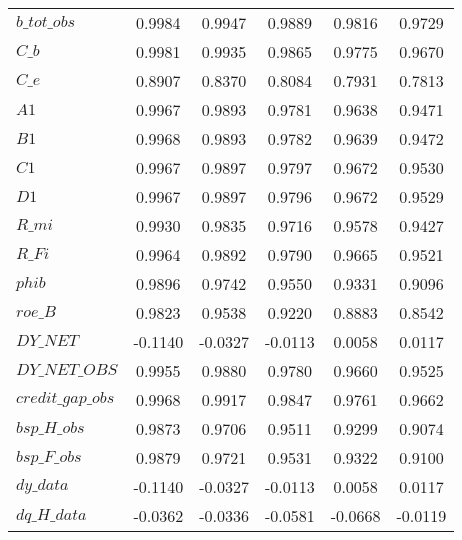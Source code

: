 \begin{center}
\begin{longtable}{lccccc}
$b\_tot\_obs                $	 & 	    0.9984	 & 	    0.9947	 & 	    0.9889	 & 	    0.9816	 & 	    0.9729 \\ 
$C\_b                       $	 & 	    0.9981	 & 	    0.9935	 & 	    0.9865	 & 	    0.9775	 & 	    0.9670 \\ 
$C\_e                       $	 & 	    0.8907	 & 	    0.8370	 & 	    0.8084	 & 	    0.7931	 & 	    0.7813 \\ 
$A1                         $	 & 	    0.9967	 & 	    0.9893	 & 	    0.9781	 & 	    0.9638	 & 	    0.9471 \\ 
$B1                         $	 & 	    0.9968	 & 	    0.9893	 & 	    0.9782	 & 	    0.9639	 & 	    0.9472 \\ 
$C1                         $	 & 	    0.9967	 & 	    0.9897	 & 	    0.9797	 & 	    0.9672	 & 	    0.9530 \\ 
$D1                         $	 & 	    0.9967	 & 	    0.9897	 & 	    0.9796	 & 	    0.9672	 & 	    0.9529 \\ 
$R\_mi                      $	 & 	    0.9930	 & 	    0.9835	 & 	    0.9716	 & 	    0.9578	 & 	    0.9427 \\ 
$R\_Fi                      $	 & 	    0.9964	 & 	    0.9892	 & 	    0.9790	 & 	    0.9665	 & 	    0.9521 \\ 
$phib                       $	 & 	    0.9896	 & 	    0.9742	 & 	    0.9550	 & 	    0.9331	 & 	    0.9096 \\ 
$roe\_B                     $	 & 	    0.9823	 & 	    0.9538	 & 	    0.9220	 & 	    0.8883	 & 	    0.8542 \\ 
$DY\_NET                    $	 & 	   -0.1140	 & 	   -0.0327	 & 	   -0.0113	 & 	    0.0058	 & 	    0.0117 \\ 
$DY\_NET\_OBS               $	 & 	    0.9955	 & 	    0.9880	 & 	    0.9780	 & 	    0.9660	 & 	    0.9525 \\ 
$credit\_gap\_obs           $	 & 	    0.9968	 & 	    0.9917	 & 	    0.9847	 & 	    0.9761	 & 	    0.9662 \\ 
$bsp\_H\_obs                $	 & 	    0.9873	 & 	    0.9706	 & 	    0.9511	 & 	    0.9299	 & 	    0.9074 \\ 
$bsp\_F\_obs                $	 & 	    0.9879	 & 	    0.9721	 & 	    0.9531	 & 	    0.9322	 & 	    0.9100 \\ 
$dy\_data                   $	 & 	   -0.1140	 & 	   -0.0327	 & 	   -0.0113	 & 	    0.0058	 & 	    0.0117 \\ 
$dq\_H\_data                $	 & 	   -0.0362	 & 	   -0.0336	 & 	   -0.0581	 & 	   -0.0668	 & 	   -0.0119 \\ 

\end{longtable}
\end{center}
